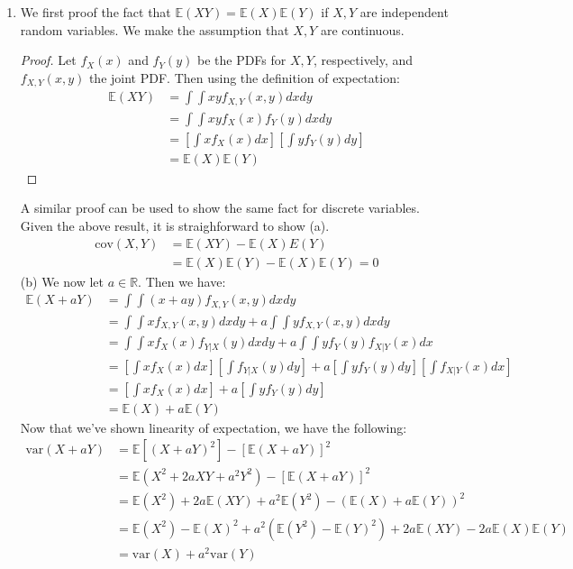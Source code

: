 \documentclass[submit]{harvardml}
\newcommand{\E}{\mathbb{E}}
\newcommand{\var}{\text{var}}
\newcommand{\cov}{\text{cov}}
\begin{document}
\begin{enumerate}[label=(\alph*)]
\item We first proof the fact that $\E(XY) = \E(X)\E(Y)$ if $X,Y$ are independent random variables. We make the assumption that $X,Y$ are continuous.
\begin{proof}
Let $f_X(x)$ and $f_Y(y)$ be the PDFs for $X,Y$, respectively, and $f_{X,Y}(x,y)$ the joint PDF. Then using the definition of expectation:
\begin{align*}
\E(XY) &= \int \int xyf_{X,Y}(x,y)dxdy \\
&= \int \int xyf_{X}(x)f_Y(y)dx dy \tag{independence of $X,Y$} \\
&= \left[\int xf_X(x)dx\right] \left[\int yf_Y(y)dy \right] \tag{properties of integrals}\\
&=\E(X)\E(Y)
\end{align*}
\end{proof}
A similar proof can be used to show the same fact for discrete variables. Given the above result, it is straighforward to show (a).
\begin{align*}
\cov(X,Y) &= \E(XY) - \E(X)E(Y) \\
&= \E(X)\E(Y) - \E(X)\E(Y) = 0 \tag{by independence of $X,Y$}
\end{align*}
(b) We now let $a \in \mathbb{R}$. Then we have:
\begin{align*}
\E(X + aY) &= \int \int (x+ay)f_{X,Y}(x,y) dx dy \\
&= \int \int xf_{X,Y}(x,y) dx dy + a\int \int y f_{X,Y}(x,y) dx dy \tag{linearity of integration} \\
&= \int \int xf_X(x)f_{Y|X}(y) dx dy + a \int \int yf_{Y}(y)f_{X|Y}(x)dx \tag{definition of joint distribution}\\
&= \left[\int xf_X(x) dx \right] \left[\int f_{Y|X}(y)dy \right] + a\left[\int yf_Y(y)dy \right]\left[\int f_{X|Y}(x)dx \right] \\
&= \left[\int xf_X(x) dx \right] + a\left[\int yf_Y(y)dy \right] \tag{integral on entire support is $1$} \\
&= \E(X) + a\E(Y)
\end{align*}
Now that we've shown linearity of expectation, we have the following:
\begin{align*}
\var(X + aY) &= \E[(X + aY)^2] - [\E(X + aY)]^2 \\
&= \E(X^2 + 2aXY + a^2Y^2) - [\E(X + aY)]^2 \\
&= \E(X^2) + 2a\E(XY) + a^2\E(Y^2) - (\E(X) + a\E(Y))^2 \tag{linearity of expectation}\\
&= \E(X^2) - \E(X)^2 + a^2(\E(Y^2) - \E(Y)^2) + 2a\E(XY) - 2a\E(X)\E(Y) \\
&= \var(X) + a^2\var(Y) \tag{$X,Y$ are independent}
\end{align*}
\end{enumerate}
\end{document}
